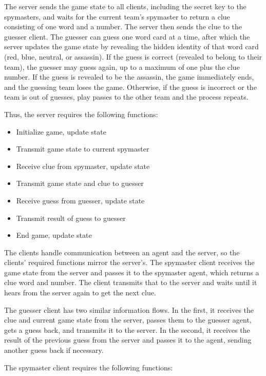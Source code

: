 \documentclass[phd,electronic,oneside,twosidetoc,letterpaper,chaptercenter,parttop,lof]{byumsphd}
\begin{document}
The server sends the game state to all clients, including the secret key to the spymasters, and waits for the current team’s spymaster to return a clue consisting of one word and a number. The server then sends the clue to the guesser client. The guesser can guess one word card at a time, after which the server updates the game state by revealing the hidden identity of that word card (red, blue, neutral, or assassin). If the guess is correct (revealed to belong to their team), the guesser may guess again, up to a maximum of one plus the clue number. If the guess is revealed to be the assassin, the game immediately ends, and the guessing team loses the game. Otherwise, if the guess is incorrect or the team is out of guesses, play passes to the other team and the process repeats. 

Thus, the server requires the following functions:

\begin{itemize}
    \setlength{\itemindent}{2em}
    \item Initialize game, update state
    \item Transmit game state to current spymaster
    \item Receive clue from spymaster, update state
    \item Transmit game state and clue to guesser
    \item Receive guess from guesser, update state
    \item Transmit result of guess to guesser
    \item End game, update state
\end{itemize}

The clients handle communication between an agent and the server, so the clients’ required functions mirror the server’s. The spymaster client receives the game state from the server and passes it to the spymaster agent, which returns a clue word and number. The client transmits that to the server and waits until it hears from the server again to get the next clue. 

The guesser client has two similar information flows. In the first, it receives the clue and current game state from the server, passes them to the guesser agent, gets a guess back, and transmits it to the server. In the second, it receives the result of the previous guess from the server and passes it to the agent, sending another guess back if necessary. 


The spymaster client requires the following functions:
\end{document}
